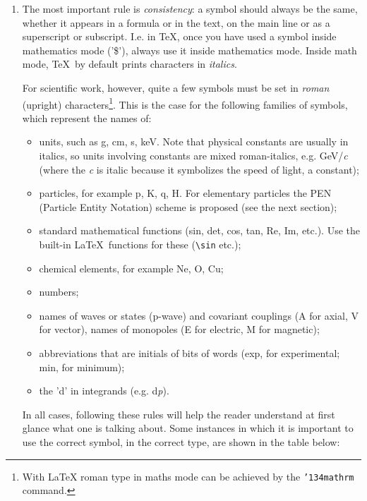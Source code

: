 \documentclass{article}
\newcommand{\bs}{{\ttfamily\char'134}}%
\begin{document}
\begin{enumerate}
\item The most important rule is
\emph{consistency}: a symbol should always be
the same, whether it appears in a formula or in the text, on the
main line or as a superscript or
subscript.
I.e. in \TeX, once you have used a symbol inside mathematics
mode ('\$'), always use it inside mathematics mode.
Inside math mode, \TeX\ by default prints characters in {\it italics}.
\par
For scientific work, however, quite a few symbols must be set in
\emph{roman} (upright) characters\footnote{With \LaTeX{} roman type in maths
mode can be achieved by the {\tt\bs mathrm} command.}.
This is the case for the following families of symbols, which represent
the names of:
\begin{itemize}
\item units, such as g, cm, s, keV.
Note that physical constants are usually in italics,
so units involving constants
are mixed roman-italics, e.g.
GeV/{\it c} (where the {\em c} is italic
because it symbolizes the speed
of light, a constant);
\item particles, for example p, K, q, H. For elementary particles
the PEN (Particle Entity Notation)
scheme is proposed (see the next section);
\item standard mathematical functions (sin, det, cos, tan, Re, Im, etc.).
Use the built-in \LaTeX\ functions for these (\verb+\sin+ etc.);
\item chemical elements, for example Ne, O, Cu;
\item numbers;
\item names of waves or states (p-wave) and covariant couplings
(A for axial, V for vector), names of monopoles (E for electric,
M for magnetic);
\item abbreviations that are initials of bits of words
(exp, for experimental; min, for minimum);
\item the 'd' in integrands (e.g. d{\it p}).
 
\end{itemize}
 
In all cases, following these rules will help the reader
understand at first glance what one is talking about.
Some instances in which it is important to use the correct symbol,
in the correct type, are shown in the table below:
 

\end{enumerate}
\end{document}
